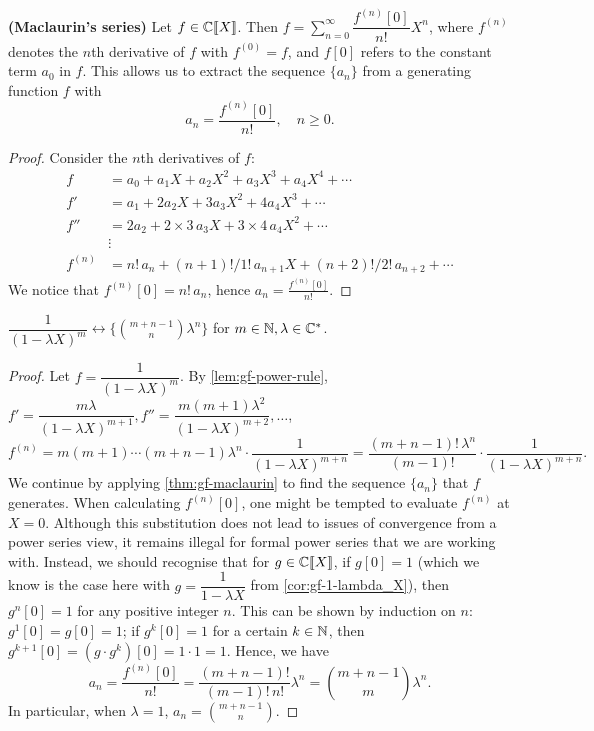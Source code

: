 \documentclass[a4paper, 12pt]{report}
\begin{document}
\begin{thm}\label{thm:gf-maclaurin}
\textbf{(Maclaurin's series)} Let $f \in \mathbb{C}\llbracket X \rrbracket$. Then $f = \sum_{n = 0}^\infty \dfrac{f^{(n)}[0]}{n!} X^n$, where $f^{(n)}$ denotes the $n$th derivative of $f$ with $f^{(0)} = f$, and $f[0]$ refers to the constant term $a_0$ in $f$. This allows us to extract the sequence $\{a_n\}$ from a generating function $f$ with \[a_n = \frac{f^{(n)}[0]}{n!}, \quad n \geq 0.\]
\end{thm}
\begin{proof}
Consider the $n$th derivatives of $f$:
\begin{align*}
f   &= a_0 + a_1 X + a_2 X^2 + a_3 X^3 + a_4 X^4 + \cdots\\
f'  &= a_1 + 2 a_2 X + 3 a_3 X^2 + 4 a_4 X^3 + \cdots\\
f'' &= 2 a_2 + 2 \times 3\,a_3 X + 3 \times 4\,a_4 X^2 + \cdots\\
&\vdots\\
f^{(n)} &= n!\,a_n + (n + 1)! / 1!\,a_{n + 1} X + (n + 2)! / 2!\,a_{n + 2} + \cdots
\end{align*}
We notice that $f^{(n)}[0] = n!\,a_n$, hence $a_n = \frac{f^{(n)}[0]}{n!}$.
\end{proof}

\begin{cor}\label{cor:gf-1-lambdaX-raised-to-m}
$\dfrac{1}{(1 - \lambda X)^m} \longleftrightarrow \{\binom{m + n - 1}{n} \lambda^n\}$ for $m \in \mathbb{N}, \lambda \in \mathbb{C}^*$.
\end{cor}
\begin{proof}
Let $f = \dfrac{1}{(1 - \lambda X)^m}$. By \cref{lem:gf-power-rule}, $f' = \dfrac{m \lambda}{(1 - \lambda X)^{m + 1}}, f'' = \dfrac{m(m + 1) \lambda^2}{(1 - \lambda X)^{m + 2}}, \dots$, 
\[
f^{(n)} 
= m (m + 1) \cdots (m + n - 1) \lambda^n \cdot \dfrac{1}{(1 - \lambda X)^{m + n}}
= \dfrac{(m + n - 1)!\,\lambda^n}{(m - 1)!} \cdot \dfrac{1}{(1 - \lambda X)^{m + n}}
.
\]
We continue by applying \cref{thm:gf-maclaurin} to find the sequence $\{a_n\}$ that $f$ generates. When calculating $f^{(n)}[0]$, one might be tempted to evaluate $f^{(n)}$ at $X = 0$. Although this substitution does not lead to issues of convergence from a power series view, it remains illegal for formal power series that we are working with. Instead, we should recognise that for $g \in \mathbb{C}\llbracket X \rrbracket$, if $g[0] = 1$ (which we know is the case here with $g = \dfrac{1}{1 - \lambda X}$ from \cref{cor:gf-1-lambda_X}), then $g^n[0] = 1$ for any positive integer $n$. This can be shown by induction on $n$: $g^1[0] = g[0] = 1$; if $g^k[0] = 1$ for a certain $k \in \mathbb{N}$, then $g^{k + 1}[0] = (g \cdot g^k)[0] = 1 \cdot 1 = 1$. Hence, we have 
\[a_n = \frac{f^{(n)}[0]}{n!} = \dfrac{(m + n - 1)!}{(m - 1)!\,n!} \lambda^n = \binom{m + n - 1}{m} \lambda^n.\]
In particular, when $\lambda = 1$, $a_n = \binom{m + n - 1}{n}$.
\end{proof}
\end{document}
